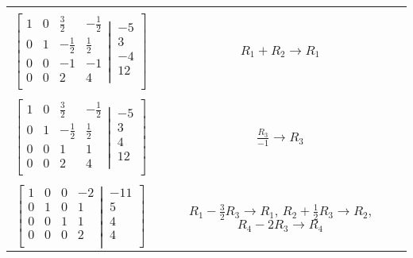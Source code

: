 \documentclass{article}
\begin{document}
\begin{table}[h]
\begin{tabular}{c|c}
\\
\\

$\left[
  \begin{matrix}
    1 & 0 & \frac{3}{2}  & -\frac{1}{2}\\  
 0 & 1 & -\frac{1}{2} & \frac{1}{2}\\
 0 & 0 & -1 & -1\\
 0 & 0 & 2 & 4 \\
  \end{matrix}
  \left|
    \,
    \begin{matrix}
      -5  \\
      3  \\
      -4  \\
      12  \\
    \end{matrix}
  \right.
\right]$ & $ R_{1} + R_{2}  \rightarrow R_{1}$

\\
\\

$\left[
  \begin{matrix}
    1 & 0 & \frac{3}{2}  & -\frac{1}{2}\\  
 0 & 1 & -\frac{1}{2} & \frac{1}{2}\\
 0 & 0 & 1 & 1\\
 0 & 0 & 2 & 4 \\
  \end{matrix}
  \left|
    \,
    \begin{matrix}
      -5  \\
      3  \\
      4  \\
      12  \\
    \end{matrix}
  \right.
\right]$ & $ \frac{R_{3}}{-1}  \rightarrow R_{3}$

\\
\\

$\left[
  \begin{matrix}
    1 & 0 & 0 & -2\\  
 0 & 1 & 0 & 1 \\
 0 & 0 & 1 & 1\\
 0 & 0 & 0 & 2 \\
  \end{matrix}
  \left|
    \,
    \begin{matrix}
      -11  \\
      5  \\
      4  \\
      4  \\
    \end{matrix}
  \right.
\right]$ & $R_{1} - \frac{3}{2}R_{3}  \rightarrow R_{1}$, 	 $R_{2} + \frac{1}{2}R_{3}  \rightarrow R_{2}$, 	$R_{4} - 2R_{3}  \rightarrow R_{4}$


\end{tabular}
\end{table}
\end{document}

